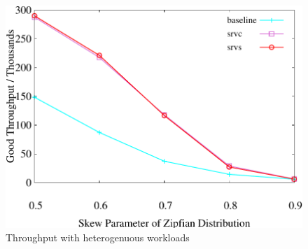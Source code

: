 \begin{figure}[t]
    \centering
    \begin{minipage}[b]{0.32\linewidth}
        \centering
        \includegraphics[width=\textwidth]{./exp_fig/weighted_size/tps}
        \vspace{-2em}
        \caption{Throughput with heterogenuous workloads}
        \label{fig:weighted:tps}
    \end{minipage}
\end{figure}
